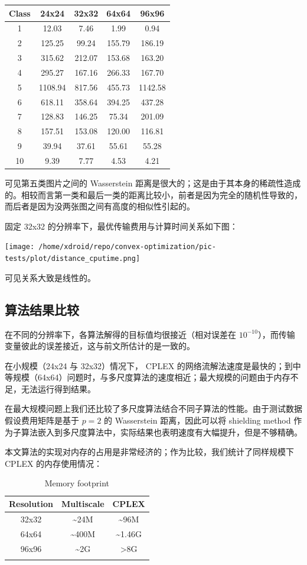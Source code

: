 \documentclass[]{article}
\begin{document}
\begin{longtable}[]{@{}c|cccc@{}}
\hline
Class & 24x24 & 32x32 & 64x64 & 96x96\tabularnewline
\hline
1 & 12.03 & 7.46 & 1.99 & 0.94\tabularnewline
2 & 125.25 & 99.24 & 155.79 & 186.19\tabularnewline
3 & 315.62 & 212.07 & 153.68 & 163.20\tabularnewline
4 & 295.27 & 167.16 & 266.33 & 167.70\tabularnewline
5 & 1108.94 & 817.56 & 455.73 & 1142.58\tabularnewline
6 & 618.11 & 358.64 & 394.25 & 437.28\tabularnewline
7 & 128.83 & 146.25 & 75.34 & 201.09\tabularnewline
8 & 157.51 & 153.08 & 120.00 & 116.81\tabularnewline
9 & 39.94 & 37.61 & 55.61 & 55.28\tabularnewline
10 & 9.39 & 7.77 & 4.53 & 4.21\tabularnewline
\hline
\end{longtable}

可见第五类图片之间的 Wasserstein
距离是很大的；这是由于其本身的稀疏性造成的。相较而言第一类和最后一类的距离比较小，前者是因为完全的随机性导致的，而后者是因为没两张图之间有高度的相似性引起的。

固定 32x32 的分辨率下，最优传输费用与计算时间关系如下图：

\texttt{[image: /home/xdroid/repo/convex-optimization/pic-tests/plot/distance\_cputime.png]}

可见关系大致是线性的。

\subsection{算法结果比较}

在不同的分辨率下，各算法解得的目标值均很接近（相对误差在
\(10^{-10}\)），而传输变量彼此的误差接近，这与前文所估计的是一致的。

在小规模（24x24 与 32x32）情况下， CPLEX
的网络流解法速度是最快的；到中等规模（64x64）问题时，与多尺度算法的速度相近；最大规模的问题由于内存不足，无法运行得到结果。

在最大规模问题上我们还比较了多尺度算法结合不同子算法的性能。由于测试数据假设费用矩阵是基于
\(p=2\) 的 Wasserstein 距离，因此可以将 shielding method
作为子算法嵌入到多尺度算法中，实际结果也表明速度有大幅提升，但是不够精确。

本文算法的实现对内存的占用是非常经济的；作为比较，我们统计了同样规模下
CPLEX 的内存使用情况：

\begin{longtable}[]{@{}c|cc@{}}
\hline
Resolution & Multiscale & CPLEX\tabularnewline
\hline
32x32 & \textasciitilde{}24M & \textasciitilde{}96M\tabularnewline
64x64 & \textasciitilde{}400M & \textasciitilde{}1.46G\tabularnewline
96x96 & \textasciitilde{}2G & \textgreater{}8G\tabularnewline
\hline
\caption{Memory footprint}
\end{longtable}
\end{document}
